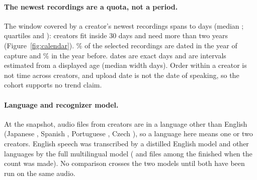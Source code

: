 \paragraph{The newest \NPerCreator{} recordings are a quota, not a period.}
The window covered by a creator's newest \NPerCreator{} recordings spans \SpanMin{} to \SpanMax{} days (median \SpanMed; quartiles \SpanQi{} and \SpanQiii): \NSpanWithinMonth{} creators fit inside 30 days and \NSpanOverTwoYears{} need more than two years (Figure~\ref{fig:calendar}). \PctDatedCaptureYear\% of the \NSelected{} selected recordings are dated in the year of capture and \PctDatedYearBefore\% in the year before. \NExactDates{} dates are exact days and \NEstimatedDates{} are intervals estimated from a displayed age (median width \EstimatedDateMedianWidth{} days). Order within a creator is not time across creators, and upload date is not the date of speaking, so the cohort supports no trend claim.

\paragraph{Language and recognizer model.}
At the snapshot, \SnapNonEnglish{} audio files from \SnapNonEnglishCreators{} creators are in a language other than English (Japanese \SnapJapanese, Spanish \SnapSpanish, Portuguese \SnapPortuguese, Czech \SnapCzech), so a language here means one or two creators. English speech was transcribed by a distilled English model and other languages by the full multilingual model (\NModelDistilEnglish{} and \NModelFull{} files among the \ModelCountBase{} finished when the count was made). No comparison crosses the two models until both have been run on the same audio.



